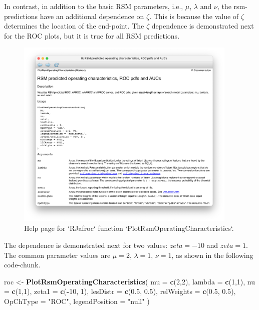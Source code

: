 \documentclass[
]{book}
\newenvironment{Shaded}{\begin{snugshade}}{\end{snugshade}}
\newcommand{\DataTypeTok}[1]{\textcolor[rgb]{0.13,0.29,0.53}{#1}}
\newcommand{\DecValTok}[1]{\textcolor[rgb]{0.00,0.00,0.81}{#1}}
\newcommand{\FloatTok}[1]{\textcolor[rgb]{0.00,0.00,0.81}{#1}}
\newcommand{\KeywordTok}[1]{\textcolor[rgb]{0.13,0.29,0.53}{\textbf{#1}}}
\newcommand{\NormalTok}[1]{#1}
\newcommand{\OperatorTok}[1]{\textcolor[rgb]{0.81,0.36,0.00}{\textbf{#1}}}
\newcommand{\StringTok}[1]{\textcolor[rgb]{0.31,0.60,0.02}{#1}}
\begin{document}
In contrast, in addition to the basic RSM parameters, i.e., \(\mu\), \(\lambda\) and \(\nu\), the rsm-predictions have an additional dependence on \(\zeta\). This is because the value of \(\zeta\) determines the location of the end-point. The \(\zeta\) dependence is demonstrated next for the ROC plots, but it is true for all RSM predictions.

\begin{figure}

{\centering \includegraphics[width=300pt]{images/rsm-predictions/PlotRsmOperatingCharacteristics} 

}

\caption{Help page for `RJafroc` function `PlotRsmOperatingCharacteristics`.}\label{fig:rsm-predictions-operating-characteristics-help}
\end{figure}

The dependence is demonstrated next for two values: \(zeta = -10\) and \(zeta = 1\). The common parameter values are \(\mu = 2\), \(\lambda = 1\), \(\nu = 1\), as shown in the following code-chunk.

\begin{Shaded}
\begin{Highlighting}[]
\NormalTok{roc <-}\StringTok{ }\KeywordTok{PlotRsmOperatingCharacteristics}\NormalTok{(}
     \DataTypeTok{mu =} \KeywordTok{c}\NormalTok{(}\DecValTok{2}\NormalTok{,}\DecValTok{2}\NormalTok{),}
     \DataTypeTok{lambda =} \KeywordTok{c}\NormalTok{(}\DecValTok{1}\NormalTok{,}\DecValTok{1}\NormalTok{),}
     \DataTypeTok{nu =} \KeywordTok{c}\NormalTok{(}\DecValTok{1}\NormalTok{,}\DecValTok{1}\NormalTok{),}
     \DataTypeTok{zeta1 =} \KeywordTok{c}\NormalTok{(}\OperatorTok{-}\DecValTok{10}\NormalTok{, }\DecValTok{1}\NormalTok{),}
     \DataTypeTok{lesDistr =} \KeywordTok{c}\NormalTok{(}\FloatTok{0.5}\NormalTok{, }\FloatTok{0.5}\NormalTok{),}
     \DataTypeTok{relWeights =} \KeywordTok{c}\NormalTok{(}\FloatTok{0.5}\NormalTok{, }\FloatTok{0.5}\NormalTok{),}
     \DataTypeTok{OpChType =} \StringTok{"ROC"}\NormalTok{,}
     \DataTypeTok{legendPosition =} \StringTok{"null"}
\NormalTok{)}
\end{Highlighting}
\end{Shaded}
\end{document}
